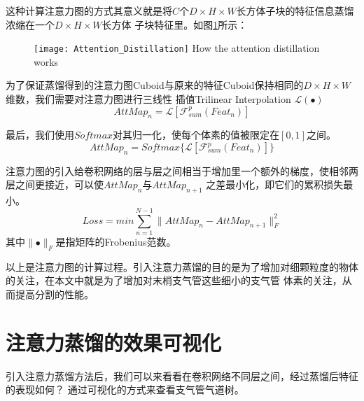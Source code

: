 这种计算注意力图的方式其意义就是将$C$个$D \times H \times W$长方体子块的特征信息蒸馏浓缩在一个$D \times H \times W$长方体
子块特征里。如图\ref{fig:attention_distillation}所示：
\begin{figure}[!htp]
    \centering
    \texttt{[image: Attention\_Distillation]}
        {How the attention distillation works}
    \label{fig:attention_distillation}
\end{figure}

为了保证蒸馏得到的注意力图Cuboid与原来的特征Cuboid保持相同的$D \times H \times W$维数，我们需要对注意力图进行三线性
插值Trilinear Interpolation $\mathcal{L}(\bullet)$
\begin{equation}
    {AttMap}_{n} = \mathcal{L}\left[\mathcal{F}_{sum}^{p}(Feat_{n})\right]
\end{equation}

最后，我们使用$Softmax$对其归一化，使每个体素的值被限定在$[0, 1]$之间。
\begin{equation}
    {AttMap}_{n} = {Softmax}\{ \mathcal{L}\left[\mathcal{F}_{sum}^{p}(Feat_{n})\right] \}
\end{equation}

注意力图的引入给卷积网络的层与层之间相当于增加里一个额外的梯度，使相邻两层之间更接近，可以使${AttMap}_{n}$与${AttMap}_{n+1}$
之差最小化，即它们的累积损失最小。
\begin{equation}
    Loss = min \sum_{n=1}^{N-1}\lVert {AttMap}_{n} - {AttMap}_{n+1} \rVert_{F}^{2}
\end{equation}
其中$\lVert \bullet \rVert_{F}$是指矩阵的Frobenius范数。

以上是注意力图的计算过程。引入注意力蒸馏的目的是为了增加对细颗粒度的物体的关注，在本文中就是为了增加对末梢支气管这些细小的支气管
体素的关注，从而提高分割的性能。

\section{注意力蒸馏的效果可视化}

引入注意力蒸馏方法后，我们可以来看看在卷积网络不同层之间，经过蒸馏后特征的表现如何？ 通过可视化的方式来查看支气管气道树。

